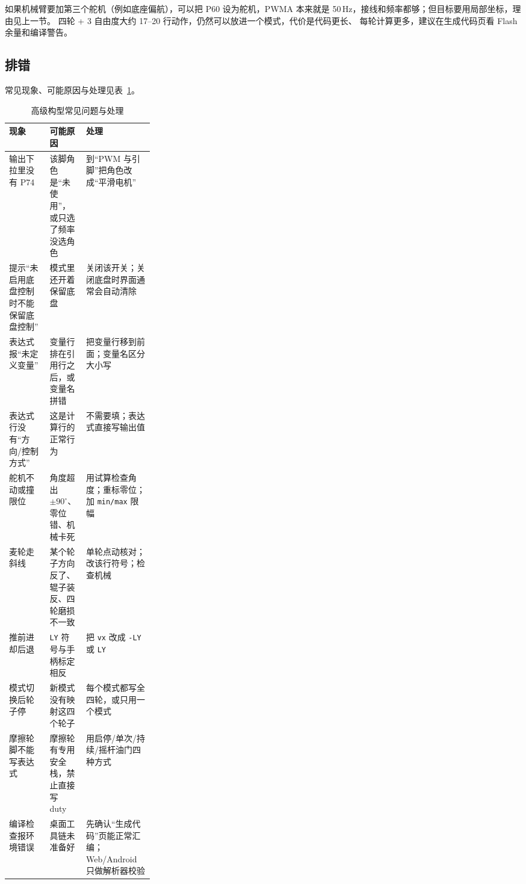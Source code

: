 如果机械臂要加第三个舵机（例如底座偏航），可以把 P60 设为舵机，PWMA
本来就是 50\,Hz，接线和频率都够；但目标要用局部坐标，理由见上一节。
四轮 + 3 自由度大约 17--20 行动作，仍然可以放进一个模式，代价是代码更长、
每轮计算更多，建议在生成代码页看 Flash 余量和编译警告。

\subsection{排错}

常见现象、可能原因与处理见表~\ref{tab:ch05-troubleshooting}。

\begin{table}[htbp]
  \centering
  \small
  \begin{tabularx}{\linewidth}{@{}>{\raggedright\arraybackslash}p{0.28\linewidth} >{\raggedright\arraybackslash}X >{\raggedright\arraybackslash}X@{}}
    \toprule
    现象 & 可能原因 & 处理 \\
    \midrule
    输出下拉里没有 P74 & 该脚角色是“未使用”，或只选了频率没选角色 & 到“PWM 与引脚”把角色改成“平滑电机” \\
    提示“未启用底盘控制时不能保留底盘控制” & 模式里还开着保留底盘 & 关闭该开关；关闭底盘时界面通常会自动清除 \\
    表达式报“未定义变量” & 变量行排在引用行之后，或变量名拼错 & 把变量行移到前面；变量名区分大小写 \\
    表达式行没有“方向/控制方式” & 这是计算行的正常行为 & 不需要填；表达式直接写输出值 \\
    舵机不动或撞限位 & 角度超出 $\pm90^\circ$、零位错、机械卡死 & 用试算检查角度；重标零位；加 \texttt{min/max} 限幅 \\
    麦轮走斜线 & 某个轮子方向反了、辊子装反、四轮磨损不一致 & 单轮点动核对；改该行符号；检查机械 \\
    推前进却后退 & \texttt{LY} 符号与手柄标定相反 & 把 \texttt{vx} 改成 \texttt{-LY} 或 \texttt{LY} \\
    模式切换后轮子停 & 新模式没有映射这四个轮子 & 每个模式都写全四轮，或只用一个模式 \\
    摩擦轮脚不能写表达式 & 摩擦轮有专用安全栈，禁止直接写 duty & 用启停/单次/持续/摇杆油门四种方式 \\
    编译检查报环境错误 & 桌面工具链未准备好 & 先确认“生成代码”页能正常汇编；Web/Android 只做解析器校验 \\
    \bottomrule
  \end{tabularx}
  \caption{高级构型常见问题与处理}
  \label{tab:ch05-troubleshooting}
\end{table}

